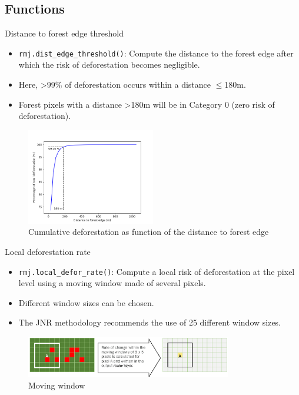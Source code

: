 \documentclass[10pt,table,dvipsnames,compress]{beamer}
\begin{document}
\subsection{Functions}
\label{sec:org6a1ac31}

\begin{frame}[label={sec:org8002631},fragile]{Distance to forest edge threshold}
 \begin{itemize}
\item \texttt{rmj.dist\_edge\_threshold()}: Compute the distance to the forest edge after which the risk of deforestation becomes negligible.
\item Here, >99\% of deforestation occurs within a distance \(\le\)180m.
\item Forest pixels with a distance >180m will be in Category 0 (zero risk of deforestation).
\end{itemize}

\begin{figure}[htbp]
\centering
\includegraphics[width=0.5\textwidth]{figs/perc_dist.png}
\caption{\label{fig:org265194b}Cumulative deforestation as function of the distance to forest edge}
\end{figure}
\end{frame}

\begin{frame}[label={sec:org262743c},fragile]{Local deforestation rate}
 \begin{itemize}
\item \texttt{rmj.local\_defor\_rate()}: Compute a local risk of deforestation at the pixel level using a moving window made of several pixels.
\item Different window sizes can be chosen.
\item The JNR methodology recommends the use of 25 different window sizes.
\end{itemize}

\begin{figure}[htbp]
\centering
\includegraphics[width=0.8\textwidth]{figs/moving_window.png}
\caption{\label{fig:orgdd64615}Moving window}
\end{figure}
\end{frame}
\end{document}

